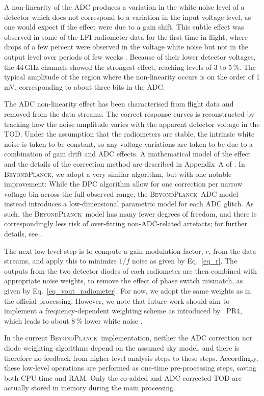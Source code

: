 \documentclass[twocolumn]{aa}
\newcommand{\BP}{\textsc{BeyondPlanck}}
\begin{document}
A non-linearity of the ADC produces a variation in the white noise
level of a detector which does not correspond to a variation in the
input voltage level, as one would expect if the effect were due to a
gain shift.  This subtle effect was observed in some of the LFI
radiometer data for the first time in flight, where drops of a few
percent were observed in the voltage white noise but not in the output
level over periods of few weeks \citep{planck2013-p02a}.  Because of
their lower detector voltages, the 44\,GHz channels showed the
strongest effect, reaching levels of 3 to 5\,\%.  The typical
amplitude of the region where the non-linearity occurs is on the order
of 1\,mV, corresponding to about three bits in the ADC.

The ADC non-linearity effect has been characterised from flight data
and removed from the data streams.  The correct response curves is
reconstructed by tracking how the noise amplitude varies with the
apparent detector voltage in the TOD.  Under the assumption that the
radiometers are stable, the intrinsic white noise is taken to be
constant, so any voltage variations are taken to be due to a
combination of gain drift and ADC effects.  A mathematical model of
the effect and the details of the correction method are described in
Appendix~A of \citet{planck2013-p02a}. In \BP, we adopt a very similar
algorithm, but with one notable improvement: While the DPC algorithm
allow for one correction per narrow voltage bin across the full
observed range, the \BP\ ADC model instead introduces a
low-dimensional parametric model for each ADC glitch. As such, the
\BP\ model has many fewer degrees of freedom, and there is
correspondingly less risk of over-fitting non-ADC-related artefacts;
for further details, see \citet{bp25}.

The next low-level step is to compute a gain modulation factor, $r$,
from the data streams, and apply this to minimize $1/f$ noise as given
by Eq.~\eqref{eq_r}. The outputs from the two detector diodes of each
radiometer are then combined with appropriate noise weights, to remove
the effect of phase switch mismatch, as given by
Eq.~\eqref{eq_vout_radiometer}. For now, we adopt the same weights as
in the official processing. However, we note that future work should
aim to implement a frequency-dependent weighting scheme as introduced
by \Planck\ PR4, which leads to about 8\,\% lower white noise
\citep{npipe}.

In the current \BP\ implementation, neither the ADC correction nor
diode weighting algorithms depend on the assumed sky model, and there
is therefore no feedback from higher-level analysis steps to these
steps. Accordingly, these low-level operations are performed as
one-time pre-processing steps, saving both CPU time and RAM. Only the
co-added and ADC-corrected TOD are actually stored in memory during
the main processing.
\end{document}
